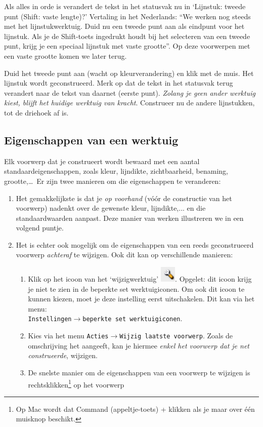 Als alles in orde is verandert de tekst in het statusvak nu in `Lijnstuk: tweede punt (Shift: vaste lengte)?' Vertaling in het Nederlands: ``We werken nog steeds met het lijnstukwerktuig. Duid nu een tweede punt aan als eindpunt voor het lijnstuk. Als je de Shift-toets ingedrukt houdt bij het selecteren van een tweede punt, krijg je een speciaal lijnstuk met vaste grootte''. Op deze voorwerpen met een vaste grootte komen we later terug.

Duid het tweede punt aan (wacht op kleurverandering) en klik met de muis. Het lijnstuk wordt geconstrueerd. Merk op dat de tekst in het statusvak terug verandert naar de tekst van daarnet (eerste punt). \emph{Zolang je geen ander werktuig kiest, blijft het huidige werktuig van kracht}. Construeer nu de andere lijnstukken, tot de driehoek af is.

\subsection{Eigenschappen van een werktuig}
Elk voorwerp dat je construeert wordt bewaard met een aantal standaardeigenschappen, zoals kleur, lijndikte, zichtbaarheid, benaming, grootte,\dots\  Er zijn twee manieren om die eigenschappen te veranderen:
\begin{enumerate}
\item Het gemakkelijkste is dat je \emph{op voorhand} (v\'{o}\'{o}r de constructie van het voorwerp) nadenkt over de gewenste kleur, lijndikte,... en die standaardwaarden aanpast. Deze manier van werken illustreren we in een volgend puntje.
\item Het is echter ook mogelijk om de eigenschappen van een reeds geconstrueerd voorwerp \emph{achteraf} te wijzigen. Ook dit kan op verschillende manieren:
\begin{enumerate}
\item Klik op het icoon van het `wijzigwerktuig' \includegraphics[width=0.75cm]{figuren/PeL/wijzigwerktuigicoon.png}. Opgelet: dit icoon krijg je niet te zien in de beperkte set werktuigiconen. Om ook dit icoon te kunnen kiezen, moet je deze instelling eerst uitschakelen. Dit kan via het menu: \\ \texttt{Instellingen$\rightarrow$beperkte set werktuigiconen}.
\item Kies via het menu \texttt{Acties$\rightarrow$Wijzig laatste voorwerp}. Zoals de omschrijving het aangeeft, kan je hiermee \emph{enkel het voorwerp dat je net construeerde}, wijzigen.
\item De snelste manier om de eigenschappen van een voorwerp te wijzigen is rechtsklikken\footnote{Op Mac wordt dat Command (appeltje-toets) + klikken als je maar over \'{e}\'{e}n muisknop beschikt.} op het voorwerp 
\end{enumerate}

\end{enumerate}

